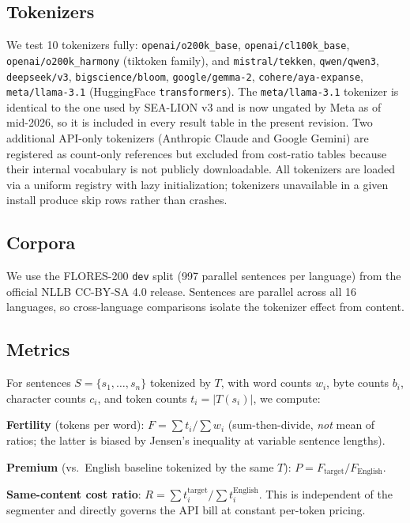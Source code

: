 \documentclass[11pt,a4paper]{article}
\begin{document}
\subsection{Tokenizers}
We test 10 tokenizers fully: \texttt{openai/o200k\_base}, \texttt{openai/cl100k\_base}, \texttt{openai/o200k\_harmony} (tiktoken family), and \texttt{mistral/tekken}, \texttt{qwen/qwen3}, \texttt{deepseek/v3}, \texttt{bigscience/bloom}, \texttt{google/gemma-2}, \texttt{cohere/aya-expanse}, \texttt{meta/llama-3.1} (HuggingFace \texttt{transformers}). The \texttt{meta/llama-3.1} tokenizer is identical to the one used by SEA-LION v3 \citep{ng2025sealion} and is now ungated by Meta as of mid-2026, so it is included in every result table in the present revision. Two additional API-only tokenizers (Anthropic Claude and Google Gemini) are registered as count-only references but excluded from cost-ratio tables because their internal vocabulary is not publicly downloadable. All tokenizers are loaded via a uniform registry with lazy initialization; tokenizers unavailable in a given install produce skip rows rather than crashes.

\subsection{Corpora}
We use the FLORES-200 \citep{costa2022no} \texttt{dev} split (997 parallel sentences per language) from the official NLLB CC-BY-SA 4.0 release. Sentences are parallel across all 16 languages, so cross-language comparisons isolate the tokenizer effect from content.

\subsection{Metrics}
For sentences $S = \{s_1, \ldots, s_n\}$ tokenized by $T$, with word counts $w_i$, byte counts $b_i$, character counts $c_i$, and token counts $t_i = |T(s_i)|$, we compute:

\textbf{Fertility} (tokens per word): $F = \sum t_i / \sum w_i$ (sum-then-divide, \emph{not} mean of ratios; the latter is biased by Jensen's inequality at variable sentence lengths).

\textbf{Premium} (vs.\ English baseline tokenized by the same $T$): $P = F_\text{target} / F_\text{English}$.

\textbf{Same-content cost ratio}: $R = \sum t_i^\text{target} / \sum t_i^\text{English}$. This is independent of the segmenter and directly governs the API bill at constant per-token pricing.
\end{document}
